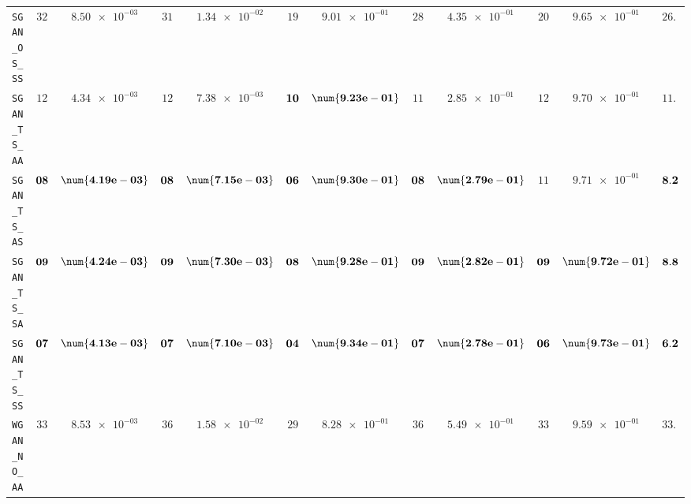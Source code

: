 \begin{xltabular}{\textwidth}{l||cC|cC|cC|cC|cC||c}
	\texttt{SGAN\_OS\_SS} & $ 32$ & $ \num{8.50e-03}$ & $ 31$ & $ \num{1.34e-02}$ & $ 19$ & $ \num{9.01e-01}$ & $ 28$ & $ \num{4.35e-01}$ & $ 20$ & $ \num{9.65e-01}$ & $ 26.0$  \\
	\texttt{SGAN\_TS\_AA} & $ 12$ & $ \num{4.34e-03}$ & $ 12$ & $ \num{7.38e-03}$ & $\bf 10$ & $\bf \num{9.23e-01}$ & $ 11$ & $ \num{2.85e-01}$ & $ 12$ & $ \num{9.70e-01}$ & $ 11.4$  \\
	\texttt{SGAN\_TS\_AS} & $\bf 08$ & $\bf \num{4.19e-03}$ & $\bf 08$ & $\bf \num{7.15e-03}$ & $\bf 06$ & $\bf \num{9.30e-01}$ & $\bf 08$ & $\bf \num{2.79e-01}$ & $ 11$ & $ \num{9.71e-01}$ & $\bf 8.2$  \\
	\texttt{SGAN\_TS\_SA} & $\bf 09$ & $\bf \num{4.24e-03}$ & $\bf 09$ & $\bf \num{7.30e-03}$ & $\bf 08$ & $\bf \num{9.28e-01}$ & $\bf 09$ & $\bf \num{2.82e-01}$ & $\bf 09$ & $\bf \num{9.72e-01}$ & $\bf 8.8$  \\
	\texttt{SGAN\_TS\_SS} & $\bf 07$ & $\bf \num{4.13e-03}$ & $\bf 07$ & $\bf \num{7.10e-03}$ & $\bf 04$ & $\bf \num{9.34e-01}$ & $\bf 07$ & $\bf \num{2.78e-01}$ & $\bf 06$ & $\bf \num{9.73e-01}$ & $\bf 6.2$  \\ \hline
	\texttt{WGAN\_NO\_AA} & $ 33$ & $ \num{8.53e-03}$ & $ 36$ & $ \num{1.58e-02}$ & $ 29$ & $ \num{8.28e-01}$ & $ 36$ & $ \num{5.49e-01}$ & $ 33$ & $ \num{9.59e-01}$ & $ 33.4$  \\

\end{xltabular}
